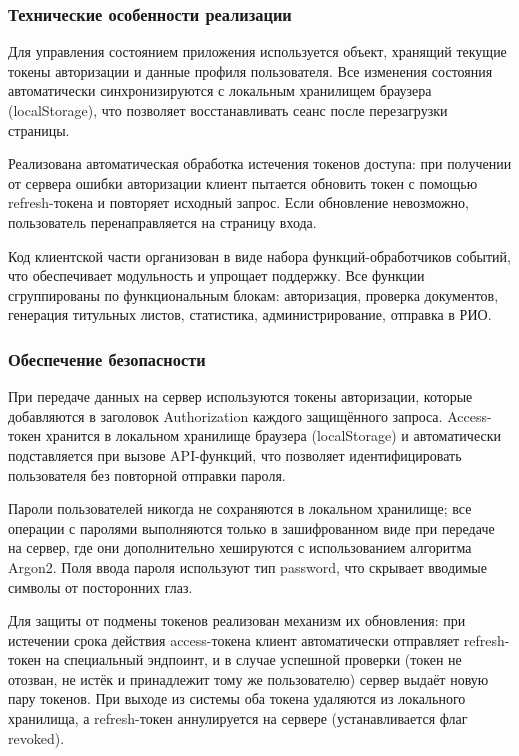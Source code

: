\subsubsection{Технические особенности реализации}

Для управления состоянием приложения используется объект, хранящий текущие токены авторизации и данные профиля пользователя. Все изменения состояния автоматически синхронизируются с локальным хранилищем браузера (localStorage), что позволяет восстанавливать сеанс после перезагрузки страницы.

Реализована автоматическая обработка истечения токенов доступа: при получении от сервера ошибки авторизации клиент пытается обновить токен с помощью refresh-токена и повторяет исходный запрос. Если обновление невозможно, пользователь перенаправляется на страницу входа.

Код клиентской части организован в виде набора функций-обработчиков событий, что обеспечивает модульность и упрощает поддержку. Все функции сгруппированы по функциональным блокам: авторизация, проверка документов, генерация титульных листов, статистика, администрирование, отправка в РИО.

\subsubsection{Обеспечение безопасности}

При передаче данных на сервер используются токены авторизации, которые добавляются в заголовок Authorization каждого защищённого запроса. Access-токен хранится в локальном хранилище браузера (localStorage) и автоматически подставляется при вызове API-функций, что позволяет идентифицировать пользователя без повторной отправки пароля.

Пароли пользователей никогда не сохраняются в локальном хранилище; все операции с паролями выполняются только в зашифрованном виде при передаче на сервер, где они дополнительно хешируются с использованием алгоритма Argon2. Поля ввода пароля используют тип password, что скрывает вводимые символы от посторонних глаз.

Для защиты от подмены токенов реализован механизм их обновления: при истечении срока действия access-токена клиент автоматически отправляет refresh-токен на специальный эндпоинт, и в случае успешной проверки (токен не отозван, не истёк и принадлежит тому же пользователю) сервер выдаёт новую пару токенов. При выходе из системы оба токена удаляются из локального хранилища, а refresh-токен аннулируется на сервере (устанавливается флаг revoked).

